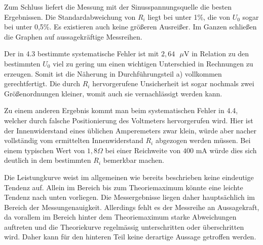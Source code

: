 Zum Schluss liefert die Messung mit der Sinusspannungsquelle die besten Ergebnissen.
Die Standardabweichung von $R_i$ liegt bei unter 1\%, die von $U_0$ sogar bei unter 0,5\%.
 Es existieren auch keine größeren Ausreißer.
 Im Ganzen schließen die Graphen auf aussagekräftige Messreihen.

Der in 4.3 bestimmte systematische Fehler ist mit $2,64\text{ }\mu$V in Relation zu den bestimmten $U_0$ viel zu gering
um einen wichtigen Unterschied in Rechnungen zu erzeugen. Somit ist die Näherung in Durchführungsteil a)
 vollkommen gerechtfertigt. Die durch $R_i$ hervorgerufene Unsicherheit ist sogar nochmals
 zwei Größenordnungen kleiner, womit auch sie vernachlässigt werden kann.

 Zu einem anderen Ergebnis kommt man beim systematischen Fehler in 4.4, welcher durch falsche Positionierung des Voltmeters hervorgerufen wird.
Hier ist der Innenwiderstand eines üblichen Amperemeters zwar klein, würde aber nacher vollständig vom ermittelten Innenwiderstand $R_i$ abgezogen werden müssen. Bei einem typischen Wert von $1,8\Omega$ bei einer Reichweite von $400$ mA würde dies sich deutlich in dem bestimmten $R_i$ bemerkbar machen.

Die Leistungkurve weist im allgemeinen wie bereits beschrieben keine eindeutige Tendenz auf. Allein im Bereich bis zum Theoriemaximum
könnte eine leichte Tendenz nach unten vorliegen. Die Messergebnisse liegen daher hauptsächlich
 im Bereich der Messungenauigkeit. Allerdings fehlt es der Messreihe an Aussagekraft, da vorallem im Bereich
  hinter dem Theoriemaximum starke Abweichungen auftreten und die Theoriekurve regelmässig
  unterschritten oder überschritten wird. Daher kann für den hinteren Teil keine derartige Aussage getroffen werden.
